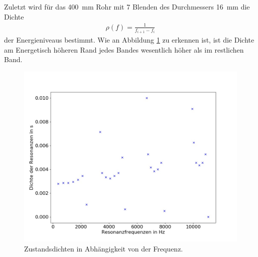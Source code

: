Zuletzt wird für das 400~mm Rohr mit 7 Blenden des Durchmessers 16~mm die Dichte 
\begin{align*}
\rho(f)=\frac{1}{f_{i+1}-f_i}
\end{align*}
der Energieniveaus bestimmt.
Wie an Abbildung \ref{fig:dos} zu erkennen ist, ist die Dichte am Energetisch höheren Rand jedes Bandes wesentlich höher als im restlichen Band.
\begin{figure}
\centering
\includegraphics[width=\textwidth]{content/Scripts/dos.jpg}
\caption{Zustandsdichten in Abhängigkeit von der Frequenz.}
\label{fig:dos}
\end{figure}
\FloatBarrier
